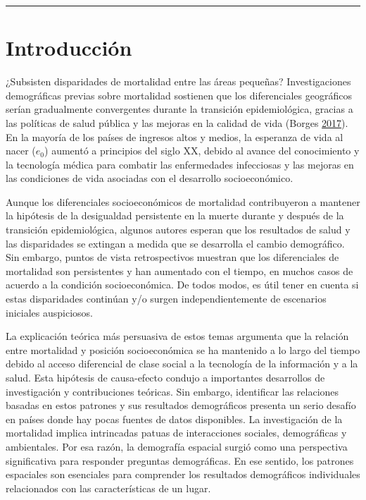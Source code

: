 \documentclass[12pt,]{article}
\begin{document}
\begin{center}\rule{0.5\linewidth}{0.5pt}\end{center}

\hypertarget{introducciuxf3n}{%
\section{Introducción}\label{introducciuxf3n}}

¿Subsisten disparidades de mortalidad entre las áreas pequeñas?
Investigaciones demográficas previas sobre mortalidad sostienen que los
diferenciales geográficos serían gradualmente convergentes durante la
transición epidemiológica, gracias a las políticas de salud pública y
las mejoras en la calidad de vida (Borges
\protect\hyperlink{ref-Borges2017}{2017}). En la mayoría de los países
de ingresos altos y medios, la esperanza de vida al nacer (\(e_0\))
aumentó a principios del siglo XX, debido al avance del conocimiento y
la tecnología médica para combatir las enfermedades infecciosas y las
mejoras en las condiciones de vida asociadas con el desarrollo
socioeconómico.

Aunque los diferenciales socioeconómicos de mortalidad contribuyeron a
mantener la hipótesis de la desigualdad persistente en la muerte durante
y después de la transición epidemiológica, algunos autores esperan que
los resultados de salud y las disparidades se extingan a medida que se
desarrolla el cambio demográfico. Sin embargo, puntos de vista
retrospectivos muestran que los diferenciales de mortalidad son
persistentes y han aumentado con el tiempo, en muchos casos de acuerdo a
la condición socioeconómica. De todos modos, es útil tener en cuenta si
estas disparidades continúan y/o surgen independientemente de escenarios
iniciales auspiciosos.

La explicación teórica más persuasiva de estos temas argumenta que la
relación entre mortalidad y posición socioeconómica se ha mantenido a lo
largo del tiempo debido al acceso diferencial de clase social a la
tecnología de la información y a la salud. Esta hipótesis de
causa-efecto condujo a importantes desarrollos de investigación y
contribuciones teóricas. Sin embargo, identificar las relaciones basadas
en estos patrones y sus resultados demográficos presenta un serio
desafío en países donde hay pocas fuentes de datos disponibles. La
investigación de la mortalidad implica intrincadas patuas de
interacciones sociales, demográficas y ambientales. Por esa razón, la
demografía espacial surgió como una perspectiva significativa para
responder preguntas demográficas. En ese sentido, los patrones
espaciales son esenciales para comprender los resultados demográficos
individuales relacionados con las características de un lugar.
\end{document}
